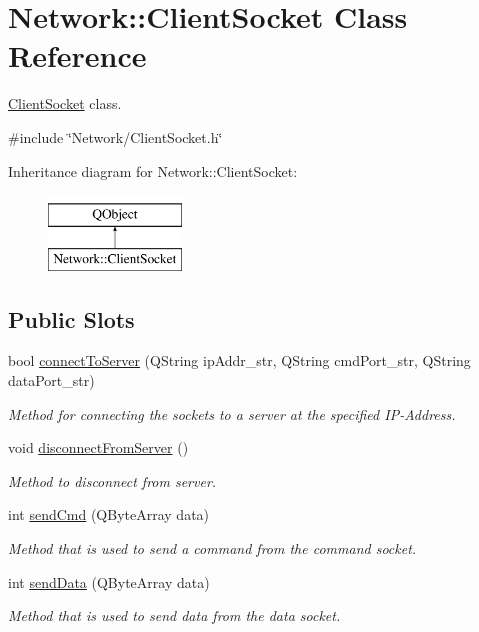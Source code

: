 \hypertarget{class_network_1_1_client_socket}{}\section{Network\+:\+:Client\+Socket Class Reference}
\label{class_network_1_1_client_socket}


\hyperlink{class_network_1_1_client_socket}{Client\+Socket} class.  




{\ttfamily \#include \char`\"{}Network/\+Client\+Socket.\+h\char`\"{}}

Inheritance diagram for Network\+:\+:Client\+Socket\+:\begin{figure}[H]
\begin{center}
\leavevmode
\includegraphics[height=2.000000cm]{class_network_1_1_client_socket}
\end{center}
\end{figure}
\subsection*{Public Slots}
\begin{DoxyCompactItemize}
\item 
bool \hyperlink{class_network_1_1_client_socket_a07c959b5abad25340d002fe613f626db}{connect\+To\+Server} (Q\+String ip\+Addr\+\_\+str, Q\+String cmd\+Port\+\_\+str, Q\+String data\+Port\+\_\+str)
\begin{DoxyCompactList}\small\item\em Method for connecting the sockets to a server at the specified I\+P-\/\+Address. \end{DoxyCompactList}\item 
void \hyperlink{class_network_1_1_client_socket_ae2e573e7eedaab70dfc2678885e8aa1f}{disconnect\+From\+Server} ()
\begin{DoxyCompactList}\small\item\em Method to disconnect from server. \end{DoxyCompactList}\item 
int \hyperlink{class_network_1_1_client_socket_afbed473a7cc51b1a0bf9f89aa3c3d5d4}{send\+Cmd} (Q\+Byte\+Array data)
\begin{DoxyCompactList}\small\item\em Method that is used to send a command from the command socket. \end{DoxyCompactList}\item 
int \hyperlink{class_network_1_1_client_socket_a64e2e70099e6deee62c9a55f87309990}{send\+Data} (Q\+Byte\+Array data)
\begin{DoxyCompactList}\small\item\em Method that is used to send data from the data socket. \end{DoxyCompactList}\end{DoxyCompactItemize}
